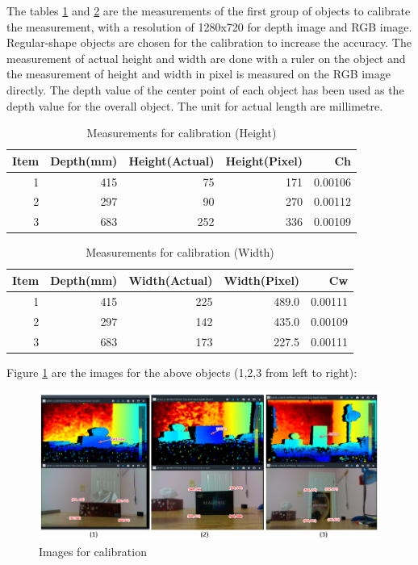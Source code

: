 \documentclass[
  oneside]{ubcthesis}
\begin{document}
The tables \ref{tab:mytable1} and \ref{tab:mytable2} are the measurements of the first group of objects to calibrate the measurement, with a resolution of 1280x720 for depth image and RGB image. Regular-shape objects are chosen for the calibration to increase the accuracy. The measurement of actual height and width are done with a ruler on the object and the measurement of height and width in pixel is measured on the RGB image directly. The depth value of the center point of each object has been used as the depth value for the overall object. The unit for actual length are millimetre.

\begin{table}

\caption{\label{tab:mytable1}Measurements for calibration (Height)}
\centering
\begin{tabular}[t]{rrrrr}
\toprule
Item & Depth(mm) & Height(Actual) & Height(Pixel) & Ch\\
\midrule
1 & 415 & 75 & 171 & 0.00106\\
2 & 297 & 90 & 270 & 0.00112\\
3 & 683 & 252 & 336 & 0.00109\\
\bottomrule
\end{tabular}
\end{table}

\begin{table}

\caption{\label{tab:mytable2}Measurements for calibration (Width)}
\centering
\begin{tabular}[t]{rrrrr}
\toprule
Item & Depth(mm) & Width(Actual) & Width(Pixel) & Cw\\
\midrule
1 & 415 & 225 & 489.0 & 0.00111\\
2 & 297 & 142 & 435.0 & 0.00109\\
3 & 683 & 173 & 227.5 & 0.00111\\
\bottomrule
\end{tabular}
\end{table}

Figure \ref{fig:figure6} are the images for the above objects (1,2,3 from left to right):

\begin{figure}

{\centering \includegraphics[width=0.9\linewidth]{figures/6} 

}

\caption{Images for calibration}\label{fig:figure6}
\end{figure}
\end{document}
